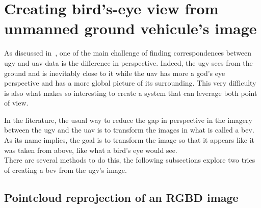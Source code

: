 \chapter{Creating bird's-eye view from unmanned ground vehicule's image}\label{ch:creating-bev-from-ugv's-image}


As discussed in~, one of the main challenge of
finding correspondences between \gls{ugv} and \gls{uav} data is the difference in perspective.
Indeed, the \gls{ugv} sees from the ground and is inevitably close to it while the \gls{uav} has more a god's eye
perspective and has a more global picture of its surrounding.
This very difficulty is also what makes so interesting to create a system that can leverage both point of view.

In the literature, the usual way to reduce the gap in perspective in the imagery between the \gls{ugv} and the \gls{uav} is to transform
the images in what is called a \gls{bev}.
As its name implies, the goal is to transform the image so that it appears like it was taken from above, like what a
bird's eye would see.\\
There are several methods to do this, the following subsections explore two tries of creating a \gls{bev} from the
\gls{ugv}'s image.


\section{Pointcloud reprojection of an RGBD image}

